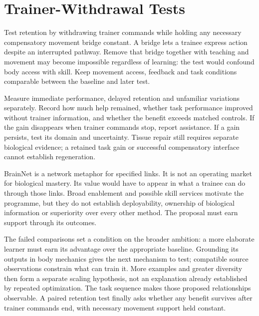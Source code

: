 \section{Trainer-Withdrawal Tests}

Test retention by withdrawing trainer commands while holding any necessary
compensatory movement bridge constant. A bridge lets a trainee express action
despite an interrupted pathway. Remove that bridge together with teaching and
movement may become impossible regardless of learning: the test would confound
body access with skill. Keep movement access, feedback and task conditions
comparable between the baseline and later test.\par

Measure immediate performance, delayed retention and unfamiliar variations separately. Record how much help remained, whether task performance improved without trainer information, and whether the benefit exceeds matched controls. If the gain disappears when trainer commands stop, report assistance. If a gain persists, test its domain and uncertainty. Tissue repair still requires separate biological evidence; a retained task gain or successful compensatory interface cannot establish regeneration.\par

BrainNet is a network metaphor for specified links. It is not an operating market for biological mastery. Its value would have to appear in what a trainee can do through those links. Broad enablement and possible skill services motivate the programme, but they do not establish deployability, ownership of biological information or superiority over every other method. The proposal must earn support through its outcomes.\par

The failed comparisons set a condition on the broader ambition: a more elaborate learner must earn its advantage over the appropriate baseline. Grounding its outputs in body mechanics gives the next mechanism to test; compatible source observations constrain what can train it. More examples and greater diversity then form a separate scaling hypothesis, not an explanation already established by repeated optimization. The task sequence makes those proposed relationships observable. A paired retention test finally asks whether any benefit survives after trainer commands end, with necessary movement support held constant.






